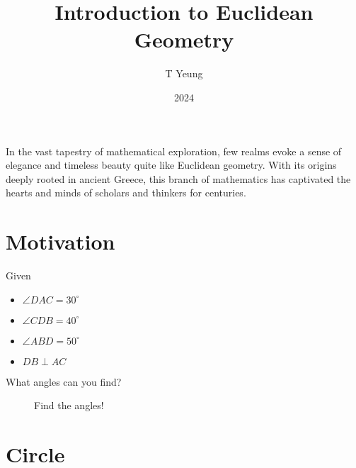 \documentclass{article}
\title{Introduction to Euclidean Geometry}
\author{T Yeung}
\date{2024}
\theoremstyle{definition}
\begin{document}
\maketitle
In the vast tapestry of mathematical exploration, few realms evoke a sense of elegance and timeless beauty quite like Euclidean geometry. With its origins deeply rooted in ancient Greece, this branch of mathematics has captivated the hearts and minds of scholars and thinkers for centuries.
\section{Motivation}
\noindent
\begin{minipage}{0.6\textwidth}
Given
\begin{itemize}
	\item $\angle DAC=30^\circ$
	\item $\angle CDB=40^\circ$
	\item $\angle ABD=50^\circ$
	\item $DB \perp AC$
\end{itemize}
What angles can you find?
\end{minipage}
\begin{minipage}{0.38\textwidth}
\centering
\begin{figure}[H]
	\caption{Find the angles!}
\end{figure}
\end{minipage}

\section{Circle}
\end{document}
